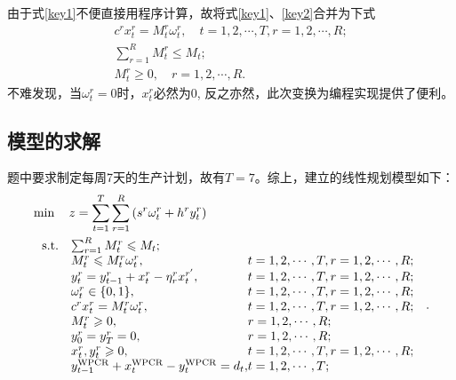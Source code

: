 	由于式\ref{key1}不便直接用程序计算，故将式\ref{key1}、\ref{key2}合并为下式
	\begin{equation}
		\begin{array}{c}
c^{r} x_{t}^{r}=M_{t}^{r} \omega_{t}^{r}, \quad t=1,2, \cdots, T, r=1,2, \cdots, R; \\
\sum_{r=1}^{R} M_{t}^{r} \leqslant M_{t}; \\
M_{t}^{r} \geqslant 0,\quad  r=1,2, \cdots, R.
\end{array}
	\end{equation}
	不难发现，当$\omega_{t}^{r} = 0$时，$x_{t}^{r}$必然为0, 反之亦然，此次变换为编程实现提供了便利。


\subsection{模型的求解} %
\label{sub:模型的求解}

题中要求制定每周7天的生产计划，故有$T = 7$。综上，建立的线性规划模型如下：
\begin{equation}\label{总模型}
	\begin{aligned}
&\min \quad z  = \sum_{t  = 1}^{T} \sum_{r = 1}^{R}\left(s^{r} \omega_{t}^{r}+h^{r} y_{t}^{r}\right)\\
& \ \begin{array}{r@{\quad}l@{}l@{\quad}l}
\mathrm{s.t. } 	&\sum_{r=1}^{R} M_{t}^{r} \leqslant M_{t}; &\\
&M_{t}^{r} \leqslant M_{t}^{r} \omega_{t}^{r}, &t=1,2, \cdots, T, r=1,2, \cdots, R;\\
& y_{t}^{r}=y_{t-1}^{r}+x_{t}^{r}-\eta_{r}^{r} x_{t}^{r^{\prime}}, &t=1,2, \cdots, T,  r=1,2, \cdots, R; \\
&\omega_{t}^{r} \in\{0,1\}, &t=1,2, \cdots, T, r=1,2, \cdots, R; \\
&c^{r} x_{t}^{r}=M_{t}^{r} \omega_{t}^{r}, &t=1,2, \cdots, T, r=1,2, \cdots, R; \\
&M_{t}^{r} \geqslant 0,& r=1,2, \cdots, R ;\\
&y_{0}^{r}=y_{T}^{r}=0,& r=1,2, \cdots, R ;\\
&x_{t}^{r}, y_{t}^{r} \geqslant 0, &t=1,2, \cdots, T, r=1,2, \cdots, R;\\
&y_{t-1}^{\mathrm{WPCR}}+x_{t}^{\mathrm{WPCR}}-y_{t}^{\mathrm{WPCR}}=d_{t}, & t=1,2, \cdots, T; \\
\end{array}.
\end{aligned}
\end{equation}



